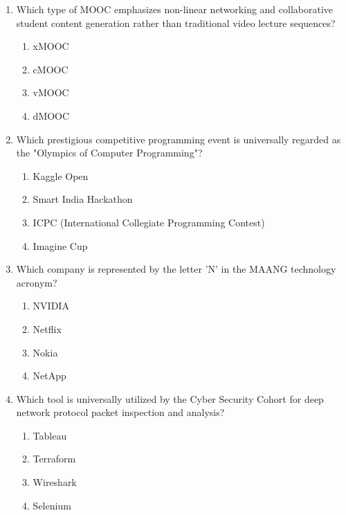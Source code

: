 \begin{enumerate}[leftmargin=1.5em]
    \item Which type of MOOC emphasizes non-linear networking and collaborative student content generation rather than traditional video lecture sequences?
    \begin{enumerate}[label=(\alph*)]
        \item xMOOC
        \item cMOOC
        \item vMOOC
        \item dMOOC
    \end{enumerate}

    \item Which prestigious competitive programming event is universally regarded as the "Olympics of Computer Programming"?
    \begin{enumerate}[label=(\alph*)]
        \item Kaggle Open
        \item Smart India Hackathon
        \item ICPC (International Collegiate Programming Contest)
        \item Imagine Cup
    \end{enumerate}

    \item Which company is represented by the letter 'N' in the MAANG technology acronym?
    \begin{enumerate}[label=(\alph*)]
        \item NVIDIA
        \item Netflix
        \item Nokia
        \item NetApp
    \end{enumerate}

    \item Which tool is universally utilized by the Cyber Security Cohort for deep network protocol packet inspection and analysis?
    \begin{enumerate}[label=(\alph*)]
        \item Tableau
        \item Terraform
        \item Wireshark
        \item Selenium
    \end{enumerate}
\end{enumerate}

